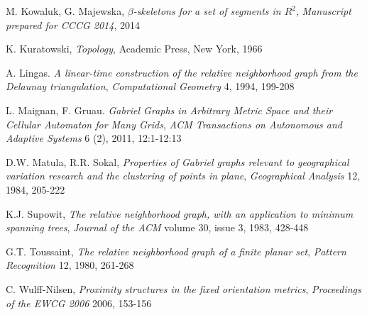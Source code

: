 \documentclass[11pt]{llncs}
\begin{document}
\begin{thebibliography}{99999}
M. Kowaluk, G. Majewska,
\textit{$\beta$-skeletons for a set of segments in $R^2$},
\textit{Manuscript prepared for CCCG 2014}, 2014

K. Kuratowski,
\textit{Topology},
Academic Press, New York, 1966

A. Lingas. 
\textit {A linear-time construction of the relative neighborhood graph 
from the Delaunay triangulation}, 
\textit{Computational Geometry} 4, 1994, 199-208

L. Maignan, F. Gruau. 
\textit {Gabriel Graphs in Arbitrary Metric Space and their Cellular Automaton for Many Grids}, 
\textit{ACM Transactions on Autonomous and Adaptive Systems} 6 (2), 2011, 12:1-12:13
 
D.W. Matula, R.R. Sokal, 
\textit{Properties of Gabriel graphs relevant to geographical variation research 
and the clustering of points in plane}, 
\textit{Geographical Analysis} 12, 1984, 205-222

K.J. Supowit, 
\textit{The relative neighborhood graph, with an application to minimum spanning trees}, 
\textit{Journal of the ACM} volume 30, issue 3, 1983, 428-448

G.T. Toussaint, 
\textit{The relative neighborhood graph of a finite planar set}, 
\textit{Pattern Recognition} 12, 1980, 261-268 

C. Wulff-Nilsen, 
\textit{Proximity structures in the fixed orientation metrics}, 
\textit{Proceedings of the EWCG 2006} 2006, 153-156

\end{thebibliography}
\end{document}
